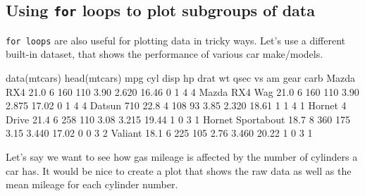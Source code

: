 \documentclass[
]{book}
\newenvironment{Shaded}{\begin{snugshade}}{\end{snugshade}}
\newcommand{\DecValTok}[1]{\textcolor[rgb]{0.00,0.00,0.81}{#1}}
\newcommand{\FloatTok}[1]{\textcolor[rgb]{0.00,0.00,0.81}{#1}}
\newcommand{\FunctionTok}[1]{\textcolor[rgb]{0.00,0.00,0.00}{#1}}
\newcommand{\NormalTok}[1]{#1}
\begin{document}
\hypertarget{using-for-loops-to-plot-subgroups-of-data}{%
\subsection*{\texorpdfstring{Using \texttt{for} loops to plot subgroups of data}{Using for loops to plot subgroups of data}}\label{using-for-loops-to-plot-subgroups-of-data}}

\texttt{for\ loops} are also useful for plotting data in tricky ways. Let's use a different built-in dataset, that shows the performance of various car make/models.

\begin{Shaded}
\begin{Highlighting}[]
\FunctionTok{data}\NormalTok{(mtcars)}
\FunctionTok{head}\NormalTok{(mtcars)}
\NormalTok{                   mpg cyl disp  hp drat    wt  qsec vs am gear carb}
\NormalTok{Mazda RX4         }\FloatTok{21.0}   \DecValTok{6}  \DecValTok{160} \DecValTok{110} \FloatTok{3.90} \FloatTok{2.620} \FloatTok{16.46}  \DecValTok{0}  \DecValTok{1}    \DecValTok{4}    \DecValTok{4}
\NormalTok{Mazda RX4 Wag     }\FloatTok{21.0}   \DecValTok{6}  \DecValTok{160} \DecValTok{110} \FloatTok{3.90} \FloatTok{2.875} \FloatTok{17.02}  \DecValTok{0}  \DecValTok{1}    \DecValTok{4}    \DecValTok{4}
\NormalTok{Datsun }\DecValTok{710}        \FloatTok{22.8}   \DecValTok{4}  \DecValTok{108}  \DecValTok{93} \FloatTok{3.85} \FloatTok{2.320} \FloatTok{18.61}  \DecValTok{1}  \DecValTok{1}    \DecValTok{4}    \DecValTok{1}
\NormalTok{Hornet }\DecValTok{4}\NormalTok{ Drive    }\FloatTok{21.4}   \DecValTok{6}  \DecValTok{258} \DecValTok{110} \FloatTok{3.08} \FloatTok{3.215} \FloatTok{19.44}  \DecValTok{1}  \DecValTok{0}    \DecValTok{3}    \DecValTok{1}
\NormalTok{Hornet Sportabout }\FloatTok{18.7}   \DecValTok{8}  \DecValTok{360} \DecValTok{175} \FloatTok{3.15} \FloatTok{3.440} \FloatTok{17.02}  \DecValTok{0}  \DecValTok{0}    \DecValTok{3}    \DecValTok{2}
\NormalTok{Valiant           }\FloatTok{18.1}   \DecValTok{6}  \DecValTok{225} \DecValTok{105} \FloatTok{2.76} \FloatTok{3.460} \FloatTok{20.22}  \DecValTok{1}  \DecValTok{0}    \DecValTok{3}    \DecValTok{1}
\end{Highlighting}
\end{Shaded}

Let's say we want to see how gas mileage is affected by the number of cylinders a car has. It would be nice to create a plot that shows the raw data as well as the mean mileage for each cylinder number.
\end{document}
